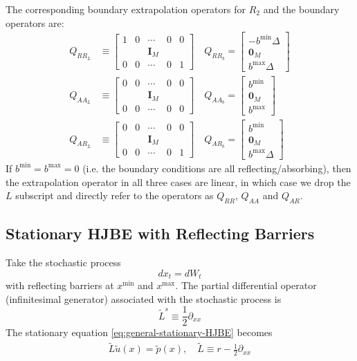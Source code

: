 \documentclass[11pt]{article}
\newcommand{\D}[1][]{\ensuremath{\partial_{#1}}}
\begin{document}
The corresponding boundary extrapolation operators for $R_2$ and the boundary operators are:
\begin{align}
	Q_{RR_L} &\equiv \begin{bmatrix}1&0&\cdots&0&0\\&&\mathbf{I}_M&&\\0&0&\cdots&0&1\end{bmatrix}\quad
	Q_{RR_b} = \begin{bmatrix}-b^{\min}\Delta\\\mathbf{0}_M\\b^{\max}\Delta\end{bmatrix}\label{eq:Q-RR}\\
	Q_{AA_L} &\equiv \begin{bmatrix}0&0&\cdots&0&0\\&&\mathbf{I}_M&&\\0&0&\cdots&0&0\end{bmatrix}\quad
	Q_{AA_b} = \begin{bmatrix}b^{\min}\\\mathbf{0}_M\\b^{\max}\end{bmatrix}\label{eq:Q-AA}\\
	Q_{AR_L} &\equiv \begin{bmatrix}0&0&\cdots&0&0\\&&\mathbf{I}_M&&\\0&0&\cdots&0&1\end{bmatrix}\quad
	Q_{AR_b} = \begin{bmatrix}b^{\min}\\\mathbf{0}_M\\b^{\max}\Delta\end{bmatrix}\label{eq:Q-AR}
\end{align}
If $b^{\min} = b^{\max} = 0$ (i.e. the boundary conditions are all reflecting/absorbing), then the extrapolation operator in all three cases are linear, in which case we drop the $L$ subscript and directly refer to the operators as $Q_{RR}$, $Q_{AA}$ and $Q_{AR}$.

\subsection{Stationary HJBE with Reflecting Barriers}\label{sec:simple-reflecting-example}
Take the stochastic process
$$
d x_t = d W_t
$$
with reflecting barriers at $x^{\min}$ and $x^{\max}$.  The partial differential operator (infinitesimal generator) associated with the stochastic process is
\begin{equation}
	\tilde{L}^s \equiv \frac{1}{2}\D[xx]\label{eq:L-s-nodrift}
\end{equation}
The stationary equation \cref{eq:general-stationary-HJBE} becomes
\begin{align}
\tilde{L} \tilde{u}(x) = \tilde{p}(x),\quad\tilde{L}\equiv r - \frac{1}{2}\partial_{xx}\label{HJBE_reflecting_barriers_PDE}
\end{align}
\end{document}
